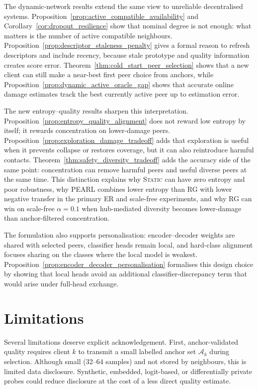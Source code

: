 \documentclass[conference]{IEEEtran}
\begin{document}
The dynamic-network results extend the same view to unreliable decentralised systems. Proposition~\ref{prop:active_compatible_availability} and Corollary~\ref{cor:dropout_resilience} show that nominal degree is not enough: what matters is the number of active compatible neighbours. Proposition~\ref{prop:descriptor_staleness_penalty} gives a formal reason to refresh descriptors and include recency, because stale prototype and quality information creates score error. Theorem~\ref{thm:cold_start_peer_selection} shows that a new client can still make a near-best first peer choice from anchors, while Proposition~\ref{prop:dynamic_active_oracle_gap} shows that accurate online damage estimates track the best currently active peer up to estimation error.

The new entropy--quality results sharpen this interpretation. Proposition~\ref{prop:entropy_quality_alignment} does not reward low entropy by itself; it rewards concentration on lower-damage peers. Proposition~\ref{prop:exploration_damage_tradeoff} adds that exploration is useful when it prevents collapse or restores coverage, but it can also reintroduce harmful contacts. Theorem~\ref{thm:safety_diversity_tradeoff} adds the accuracy side of the same point: concentration can remove harmful peers and useful diverse peers at the same time. This distinction explains why \textsc{Static} can have zero entropy and poor robustness, why \textsc{PEARL} combines lower entropy than \textsc{RG} with lower negative transfer in the primary ER and scale-free experiments, and why \textsc{RG} can win on scale-free $\alpha=0.1$ when hub-mediated diversity becomes lower-damage than anchor-filtered concentration.

The formulation also supports personalisation: encoder--decoder weights are shared with selected peers, classifier heads remain local, and hard-class alignment focuses sharing on the classes where the local model is weakest. Proposition~\ref{prop:encoder_decoder_personalisation} formalises this design choice by showing that local heads avoid an additional classifier-discrepancy term that would arise under full-head exchange.



\section{Limitations}
\label{sec:limitations}

Several limitations deserve explicit acknowledgement. First, anchor-validated quality requires client \(k\) to transmit a small labelled anchor set \(\mathcal{A}_k\) during selection. Although small (32--64 samples) and not stored by neighbours, this is limited data disclosure. Synthetic, embedded, logit-based, or differentially private probes could reduce disclosure at the cost of a less direct quality estimate.
\end{document}
